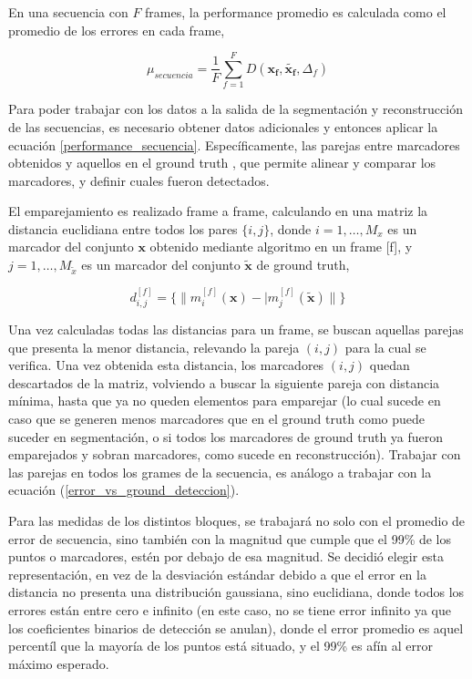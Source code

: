 En una secuencia con $F$ frames, la performance promedio es calculada como el promedio de los errores en cada frame,

\begin{equation}
\mu_{secuencia} = \frac{1}{F}\sum_{f=1}^{F} D(\boldsymbol{x_{f}},\boldsymbol{\tilde{x_{f}}},\Delta_{f})
\label{performance_secuencia}
\end{equation}

Para poder trabajar con los datos a la salida de la segmentación y reconstrucción de las secuencias, es necesario obtener datos adicionales y entonces aplicar la ecuación \ref{performance_secuencia}. Específicamente, las parejas entre marcadores obtenidos y aquellos en el ground truth , que permite alinear y comparar los marcadores, y definir cuales fueron detectados.

El emparejamiento es realizado frame a frame, calculando en una matriz la distancia euclidiana entre todos los pares $\{i,j\}$, donde $i=1,\ldots,M_{x}$ es un marcador del conjunto $\boldsymbol{x}$ obtenido mediante algoritmo en un frame [f], y $j=1,\ldots,M_{\tilde{x}}$ es un marcador del conjunto $\boldsymbol{\tilde{x}}$ de ground truth,

\begin{equation}
d_{i,j}^{[f]} = \{\|m_{i}^{[f]}(\boldsymbol{x})-|m_{j}^{[f]}(\boldsymbol{\tilde{x}})\|\}
\label{distancia_algoritmo_ground}
\end{equation}

Una vez calculadas todas las distancias para un frame, se buscan aquellas parejas que presenta la menor distancia, relevando la pareja $(i,j)$  para la cual se verifica. Una vez obtenida esta distancia, los marcadores $(i,j)$ quedan descartados de la matriz, volviendo a buscar la siguiente pareja con distancia mínima, hasta que ya no queden elementos para emparejar (lo cual sucede en caso que se generen menos marcadores que en el ground truth como puede suceder en segmentación, o si todos los marcadores de ground truth ya fueron emparejados y sobran marcadores, como sucede en reconstrucción). Trabajar con las parejas en todos los grames de la secuencia, es análogo a trabajar con la ecuación (\ref{error_vs_ground_deteccion}).

Para las medidas de los distintos bloques, se trabajará no solo con el promedio de error de secuencia, sino también con la magnitud que cumple que el 99\% de los puntos o marcadores, estén por debajo de esa magnitud. Se decidió elegir esta representación, en vez de la desviación estándar debido a que el error en la distancia no presenta una distribución gaussiana, sino euclidiana, donde todos los errores están entre cero e infinito (en este caso, no se tiene error infinito ya que los coeficientes binarios de detección se anulan), donde el error promedio es aquel percentíl que la mayoría de los puntos está situado, y el 99\% es afín al error máximo esperado.

